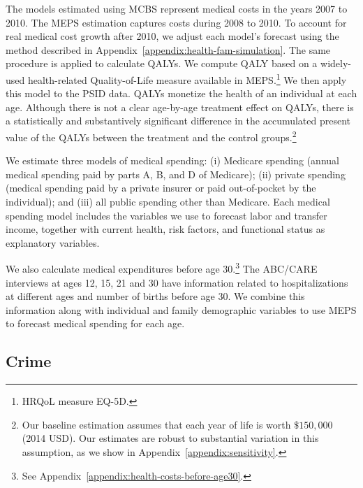 The models estimated using MCBS represent medical costs in the years 2007 to 2010. The MEPS estimation captures costs during 2008 to 2010. To account for real medical cost growth after 2010, we adjust each model's forecast using the method described in  Appendix~\ref{appendix:health-fam-simulation}. The same procedure is applied to calculate QALYs. We compute QALY based on a widely-used health-related Quality-of-Life measure available in MEPS.\footnote{HRQoL measure EQ-5D.} We then apply this model to the PSID data. QALYs monetize the health of an individual at each age. Although there is not a clear age-by-age treatment effect on QALYs, there is a statistically and substantively significant difference in the accumulated present value of the QALYs between the treatment and the control groups.\footnote{Our baseline estimation assumes that each year of life is worth  $\$150,000$ (2014 USD). Our estimates are robust to substantial variation in this assumption, as we show in  Appendix~\ref{appendix:sensitivity}.}

We estimate three models of medical spending: (i) Medicare spending (annual medical spending paid by parts A, B, and D of Medicare); (ii) private spending (medical spending paid by a private insurer or paid out-of-pocket by the individual); and (iii) all public spending other than Medicare. Each medical spending model includes the variables we use to forecast labor and transfer income, together with current health, risk factors, and functional status as explanatory variables.

We also calculate medical expenditures before age 30.\footnote{See Appendix~\ref{appendix:health-costs-before-age30}.} The ABC/CARE interviews at ages 12, 15, 21 and 30 have information related to hospitalizations at different ages and number of births before age 30. We combine this information along with individual and family demographic variables to use MEPS to forecast medical spending for each age.

\subsection{Crime}

